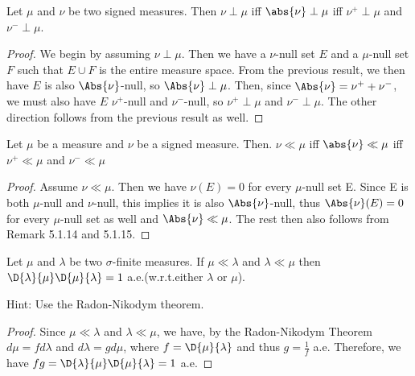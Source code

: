 \documentclass[12pt,letterpaper,twoside]{hmcpset}
\begin{document}
\begin{problem}[3]
 Let $\mu$ and $\nu$ be two signed measures.  Then $\nu \perp \mu$ iff $\abs{\nu} \perp \mu$ iff $\nu^+ \perp \mu$ and $\nu^- \perp \mu$.
\end{problem}

\begin{solution}
 \begin{proof}
  We begin by assuming $\nu \perp \mu$.  Then we have a $\nu$-null set $E$ and a $\mu$-null set $F$ such that $E \cup F$ is the entire measure space.  From the previous result, we then have $E$ is also $\Abs{\nu}$-null, so $\Abs{\nu} \perp \mu$.  Then, since $\Abs{\nu} = \nu^+ + \nu^-$, we must also have $E$ $\nu^+$-null and $\nu^-$-null, so $\nu^+ \perp \mu$ and $\nu^- \perp \mu$.  The other direction follows from the previous result as well.
 \end{proof}
\end{solution}


\begin{problem}[4]
 Let $\mu$ be a measure and $\nu$ be a signed measure. Then. $\nu \ll \mu$ iff $\abs{\nu} \ll \mu$ iff $\nu^+ \ll \mu$ and $\nu^- \ll \mu$
\end{problem}

\begin{solution}
 \begin{proof}
  Assume $\nu \ll \mu$. Then we have $\nu(E) = 0$ for every $\mu$-null set E.  Since E is both $\mu$-null and $\nu$-null, this implies it is also $\Abs{\nu}$-null, thus $\Abs{\nu}(E) = 0$ for every $\mu$-null set as well and $\Abs{\nu} \ll \mu$.  The rest then also follows from Remark 5.1.14 and 5.1.15.
 \end{proof}
\end{solution}



\begin{problem}[5]
 Let $\mu$ and $\lambda$ be two $\sigma$-finite measures. If $\mu \ll \lambda$ and $\lambda \ll \mu$ then $\D{\lambda}{\mu}\D{\mu}{\lambda} = 1$ a.e.\@ (w.r.t.\@ either $\lambda$ or $\mu$).
 
 Hint: Use the Radon-Nikodym theorem.
\end{problem}

\begin{solution}
 \begin{proof}
  Since $\mu \ll \lambda$ and $\lambda \ll \mu$, we have, by the Radon-Nikodym Theorem $d\mu = f d\lambda$ and $d\lambda = g d\mu$, where $f = \D{\mu}{\lambda}$ and thus $g = \frac{1}{f}$ a.e.  Therefore, we have $fg = \D{\lambda}{\mu}\D{\mu}{\lambda}  = 1$ a.e.
  \end{proof}

\end{solution}
\end{document}
